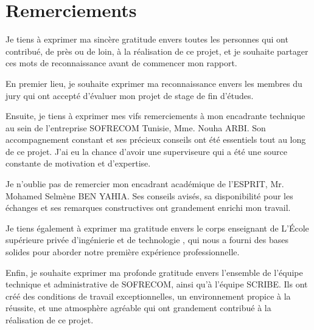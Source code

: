 \chapter*{\huge Remerciements}

\begin{center}
Je tiens à exprimer ma sincère gratitude envers toutes les personnes qui ont contribué, de près ou de loin, à la réalisation de ce projet, et je souhaite partager ces mots de reconnaissance avant de commencer mon rapport.

\vspace{0.6\baselineskip}
En premier lieu, je souhaite exprimer ma reconnaissance envers les membres du jury qui ont accepté d'évaluer mon projet de stage de fin d'études.

\vspace{0.6\baselineskip}
Ensuite, je tiens à exprimer mes vifs remerciements à mon encadrante technique au sein de l'entreprise SOFRECOM Tunisie, Mme. Nouha ARBI. Son accompagnement constant et ses précieux conseils ont été essentiels tout au long de ce projet. J'ai eu la chance d'avoir une superviseure qui a été une source constante de motivation et d'expertise.

\vspace{0.6\baselineskip}
Je n'oublie pas de remercier mon encadrant académique de l'ESPRIT, Mr. Mohamed Selmène BEN YAHIA. Ses conseils avisés, sa disponibilité pour les échanges et ses remarques constructives ont grandement enrichi mon travail.

\vspace{0.6\baselineskip}
Je tiens également à exprimer ma gratitude envers le corps enseignant de L'École supérieure privée d'ingénierie et de technologie , qui nous a fourni des bases solides pour aborder notre première expérience professionnelle.

\vspace{0.6\baselineskip}
Enfin, je souhaite exprimer ma profonde gratitude envers l'ensemble de l'équipe technique et administrative de SOFRECOM, ainsi qu'à l'équipe SCRIBE. Ils ont créé des conditions de travail exceptionnelles, un environnement propice à la réussite, et une atmosphère agréable qui ont grandement contribué à la réalisation de ce projet.

\end{center}





